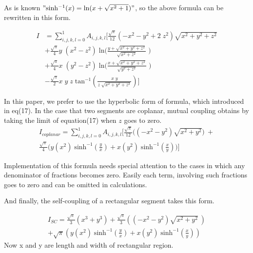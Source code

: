 \documentclass[final,5p,times,twocolumn]{elsarticle}
\begin{document}
As is known $"\mathrm{sinh^{-1}}(x) = \mathrm{ln}(x+\sqrt{x^2 + 1})"$,
so the above formula can be rewritten in this form.

\begin{equation}\label {eq:18}
\begin{split}
I&=\sum_{i,j,k,l=0}^1 A_{i,j,k,l}\bigg[\frac {\sqrt{\pi} } {12} (-x^2-y^2+2\;z^2)\sqrt{x^2 + y^2 + z^2}   \\
& + \frac {\sqrt{\pi} } {4}  y\;(x^2 - z^2)\;\mathrm{ln}\Big(\frac{y+\sqrt{ {x^2 + y^2 + z^2}}}{\sqrt{x^2 + z^2}}\;\Big) \\
& + \frac {\sqrt{\pi} } {4} x\;(y^2-z^2)\; \mathrm{ln}\Big(\frac{x+\sqrt{ {x^2 + y^2 + z^2}}}{\sqrt{y^2 + z^2}}\;  \Big)\\ 
&- \frac {\sqrt{\pi} } {2}x \;y\;z\;\mathrm{tan^{-1}}(\frac{x\;y}{z\;\sqrt{x^2+y^2 + z^2}} ) \bigg]
\end{split}
\end{equation}

In this paper, we prefer to use the hyperbolic form of formula, which introduced in eq(17).
In the case that two segments are coplanar, mutual coupling obtains by taking the limit of equation(17) when $z$ goes to zero.
\begin{equation}\label {eq:19}
\begin{split}
I_{coplanar}=\sum_{i,j,k,l=0}^1  A_{i,j,k,l} \bigg[  \frac {\sqrt{\pi} } {12} \Big((-x^2-y^2)\sqrt{x^2 + y^2} \Big)\ + \\
 \frac {\sqrt{\pi} } {4} \Big( y(x^2 )\;\mathrm{sinh^{-1}}(\frac{y}{x })+x(y^2)\;\mathrm{sinh^{-1}}(\frac{x}{y}) \Big) \bigg]
\end{split}
\end{equation}

Implementation of this formula needs special attention to the cases in which any denominator of fractions becomes zero. Easily each term, involving such fractions goes to zero and can be omitted in calculations.


And finally, the self-coupling of a rectangular segment takes this form.

\begin{equation}\label {eq:20}
\begin {split}
I_{SC} = \frac {\sqrt{\pi} } {3} (x^3+y^3) 
+ \frac {\sqrt{\pi} } {3} \left((-x^2-y^2) \sqrt{x^2 + y^2}\ \right) \\ +\sqrt{\pi} \left( y(x^2 )\;\mathrm{sinh^{-1}}(\frac{y}{x})+x(y^2)\;\mathrm{sinh^{-1}}(\frac{x}{y})  \right)
\end {split}
\end{equation}
Now x and y are length and width of rectangular region.
\end{document}
